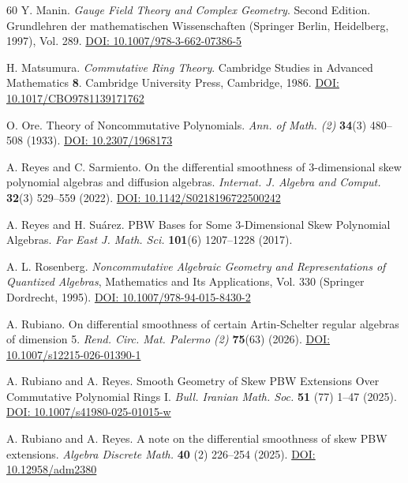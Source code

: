 \documentclass{amsart}
\theoremstyle{definition}
\theoremstyle{remark}
\numberwithin{equation}{section}
\begin{document}
\begin{thebibliography}{60}
 Y. Manin. {\em Gauge Field Theory and Complex Geometry}.  Second Edition. Grundlehren der mathematischen Wissenschaften (Springer Berlin, Heidelberg, 1997), Vol. 289. \href{https://doi.org/10.1007/978-3-662-07386-5}{DOI: 10.1007/978-3-662-07386-5}

 H. Matsumura. {\em Commutative Ring Theory}. Cambridge Studies in Advanced Mathematics {\bf 8}. Cambridge University Press, Cambridge, 1986. \href{https://doi.org/10.1017/CBO9781139171762}{DOI: 10.1017/CBO9781139171762}


 O. Ore. Theory of Noncommutative Polynomials. {\em Ann. of Math. (2)} {\bf 34}(3) 480--508 (1933). \href{https://doi.org/10.2307/1968173}{DOI: 10.2307/1968173}

 A. Reyes and C. Sarmiento. On the differential smoothness of 3-dimensional skew polynomial algebras and diffusion algebras. {\em Internat. J. Algebra and Comput.} {\bf 32}(3) 529--559 (2022). \href{https://doi.org/10.1142/S0218196722500242}{DOI: 10.1142/S0218196722500242}

 A. Reyes and H. Su\'arez. PBW Bases for Some 3-Dimensional Skew Polynomial Algebras. {\em Far East J. Math. Sci.} {\bf 101}(6) 1207--1228 (2017).

 A. L. Rosenberg. {\em Noncommutative Algebraic Geometry and Representations of Quantized Algebras}, Mathematics and Its Applications, Vol. 330 (Springer Dordrecht, 1995). \href{https://doi.org/10.1007/978-94-015-8430-2}{DOI: 10.1007/978-94-015-8430-2}

 A. Rubiano. On differential smoothness of certain Artin-Schelter regular algebras of dimension 5. {\em Rend. Circ. Mat. Palermo (2)} {\bf 75}(63) (2026). \href{https://doi.org/10.1007/s12215-026-01390-1}{DOI: 10.1007/s12215-026-01390-1}

 A. Rubiano and A. Reyes. Smooth Geometry of Skew PBW Extensions Over Commutative Polynomial Rings I. {\em Bull. Iranian Math. Soc.} {\bf 51} (77) 1--47 (2025). \href{https://doi.org/10.1007/s41980-025-01015-w}{DOI: 10.1007/s41980-025-01015-w}

 A. Rubiano and A. Reyes. A note on the differential smoothness of skew PBW extensions. {\em Algebra Discrete Math.} {\bf 40} (2) 226--254 (2025). \href{http://dx.doi.org/10.12958/adm2380}{DOI: 10.12958/adm2380}


\end{thebibliography}
\end{document}
